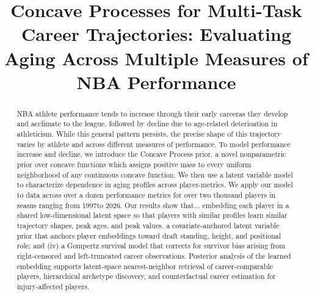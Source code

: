 \documentclass[aoas]{imsart}
\begin{document}
\begin{frontmatter}

\title{Concave Processes for Multi-Task Career Trajectories: Evaluating Aging Across Multiple Measures of NBA Performance }


\begin{abstract}

NBA athlete performance tends to increase through their early careeras they develop and acclimate to the league, followed by decline due to age-related deterioation in athleticism. While this general pattern persists, the precise shape of this trajectory varies by athlete and across different measures of performance. To model performance increase and decline, we introduce the Concave Process prior,
a novel nonparametric prior over concave functions which assigns positive mass to
every uniform neighborhood of any continuous concave function. We then use a latent variable model to characterize dependence in aging profiles across player-metrics.  We apply our model to data across over a dozen performance
metrics for over two thousand players in seasns ranging from 1997to 2026. Our results show that...
%
embedding each player in a
shared low-dimensional latent space so that players with similar profiles learn
similar trajectory shapes, peak ages, and peak values.
%
a covariate-anchored latent variable prior that anchors player embeddings toward
draft standing, height, and positional role; and (iv) a Gompertz survival model
that corrects for survivor bias arising from right-censored and left-truncated
career observations.
%
Posterior analysis of the learned embedding supports latent-space nearest-neighbor
retrieval of career-comparable players, hierarchical archetype discovery, and
counterfactual career estimation for injury-affected players.

\end{abstract}

\begin{keyword}
\end{keyword}

\end{frontmatter}
\end{document}
